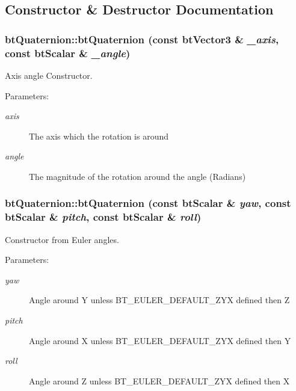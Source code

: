 \subsection{Constructor \& Destructor Documentation}
\hypertarget{classbt_quaternion_2b2e9ed0014eb26ed076808fb76e9d69}{
\subsubsection[btQuaternion]{\setlength{\rightskip}{0pt plus 5cm}btQuaternion::btQuaternion (const btVector3 \& {\em \_\-axis}, \/  const btScalar \& {\em \_\-angle})}}
\label{classbt_quaternion_2b2e9ed0014eb26ed076808fb76e9d69}


Axis angle Constructor. 

\begin{Desc}
\item[Parameters:]
\begin{description}
\item[{\em axis}]The axis which the rotation is around \item[{\em angle}]The magnitude of the rotation around the angle (Radians) \end{description}
\end{Desc}
\hypertarget{classbt_quaternion_8bd5d699377ba585749d325076616ffb}{
\subsubsection[btQuaternion]{\setlength{\rightskip}{0pt plus 5cm}btQuaternion::btQuaternion (const btScalar \& {\em yaw}, \/  const btScalar \& {\em pitch}, \/  const btScalar \& {\em roll})}}
\label{classbt_quaternion_8bd5d699377ba585749d325076616ffb}


Constructor from Euler angles. 

\begin{Desc}
\item[Parameters:]
\begin{description}
\item[{\em yaw}]Angle around Y unless BT\_\-EULER\_\-DEFAULT\_\-ZYX defined then Z \item[{\em pitch}]Angle around X unless BT\_\-EULER\_\-DEFAULT\_\-ZYX defined then Y \item[{\em roll}]Angle around Z unless BT\_\-EULER\_\-DEFAULT\_\-ZYX defined then X \end{description}
\end{Desc}


